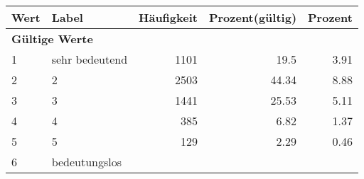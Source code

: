      \begin{longtable}{lXrrr}
     \toprule
     \textbf{Wert} & \textbf{Label} & \textbf{Häufigkeit} & \textbf{Prozent(gültig)} & \textbf{Prozent} \\
     \endhead
     \midrule
     \multicolumn{5}{l}{\textbf{Gültige Werte}}\\

     1 &
     \multicolumn{1}{X}{ sehr bedeutend   } &


       \num{1101} &
       \num[round-mode=places,round-precision=2]{19.5} &
         \num[round-mode=places,round-precision=2]{3.91} \\

     2 &
     \multicolumn{1}{X}{ 2   } &


       \num{2503} &
       \num[round-mode=places,round-precision=2]{44.34} &
         \num[round-mode=places,round-precision=2]{8.88} \\

     3 &
     \multicolumn{1}{X}{ 3   } &


       \num{1441} &
       \num[round-mode=places,round-precision=2]{25.53} &
         \num[round-mode=places,round-precision=2]{5.11} \\

     4 &
     \multicolumn{1}{X}{ 4   } &


       \num{385} &
       \num[round-mode=places,round-precision=2]{6.82} &
         \num[round-mode=places,round-precision=2]{1.37} \\

     5 &
     \multicolumn{1}{X}{ 5   } &


       \num{129} &
       \num[round-mode=places,round-precision=2]{2.29} &
         \num[round-mode=places,round-precision=2]{0.46} \\

     6 &
     \multicolumn{1}{X}{ bedeutungslos   } &



\end{longtable}
